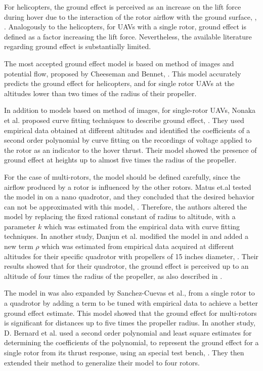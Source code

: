 \documentclass[twocolumn,10pt]{asme2ej}
\begin{document}
For helicopters, the ground effect is perceived as an increase on the lift force during hover due to the interaction of the rotor airflow with the ground surface, \cite{Tanner2015}, \cite{Xin1999}. Analogously to the helicopters, for UAVs with a single rotor, ground effect is defined as a factor increasing the lift force. Nevertheless, the available literature regarding ground effect is substantially limited.

The most accepted ground effect model is based on method of images and potential flow, proposed by Cheeseman and Bennet, \cite{Cheeseman1955}. This model accurately predicts the ground effect for helicopters, and for single rotor UAVs at the altitudes lower than two times of the radius of their propeller.

In addition to models based on method of images, for single-rotor UAVs, Nonaka et al. proposed curve fitting techniques to describe ground effect, \cite{Nonaka2011}. They used empirical data obtained at different altitudes and identified the coefficients of a second order polynomial by curve fitting on the recordings of voltage applied to the rotor as an indicator to the hover thrust. Their model showed the presence of ground effect at heights up to almost five times the radius of the propeller. %

For the case of multi-rotors, the model should be defined carefully, since the airflow produced by a rotor is influenced by the other rotors. Matus et.al tested the model in \cite{Cheeseman1955} on a nano quadrotor, and they concluded that the desired behavior can not be approximated with this model, \cite{AMVargas2017}. Therefore, the authors altered the model by replacing the fixed rational constant of radius to altitude, with a parameter $k$ which was estimated from the empirical data with curve fitting techniques. In another study, Danjun et al. modified the model in \cite{Cheeseman1955} and added a new term $\rho$ which was estimated from empirical data acquired at different altitudes for their specific quadrotor with propellers of 15 inches diameter, \cite{Danjun2015}. Their results showed that for their quadrotor, the ground effect is perceived up to an altitude of four times the radius of the propeller, as also described in \cite{Powers2013}.

The model in \cite{Cheeseman1955} was also expanded by Sanchez-Cuevas et al.\cite{Sanchez-Cuevas2017}, from a single rotor to a quadrotor by adding a term to be tuned with empirical data to achieve a better ground effect estimate. This model showed that the ground effect for multi-rotors is significant for distances up to five times the propeller radius. In another study, D. Bernard et al. used a second order polynomial and least square estimates for determining the coefficients of the polynomial, to represent the ground effect for a single rotor from its thrust response, using an special test bench, \cite{Bernard2017}. They then extended their method to generalize their model to four rotors.
\end{document}
